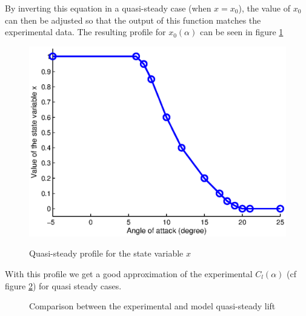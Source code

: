 \par By inverting this equation in a quasi-steady case (when $x=x_0$), the value of $x_0$ can then be adjusted so that the output of this function matches the experimental data. 
The resulting profile for $x_0(\alpha)$ can be seen in figure \ref{fig:x_0_vs_alpha}

\begin{figure}[h]
  \begin{center}
    \scalebox{1.0}
    {\includegraphics{./Figures/x_0_vs_alpha.eps}}
  \end{center}
  \caption{Quasi-steady profile for the state variable $x$}
  \label{fig:x_0_vs_alpha}
\end{figure}

\FloatBarrier
With this profile we get a good approximation of the experimental $C_l(\alpha)$ (cf figure \ref{fig:GK_Cl_vs_alpha}) for quasi steady cases.

\begin{figure}[h]
  \begin{center}
  \end{center}
  \caption{Comparison between the experimental and model quasi-steady lift}
  \label{fig:GK_Cl_vs_alpha}
\end{figure}

